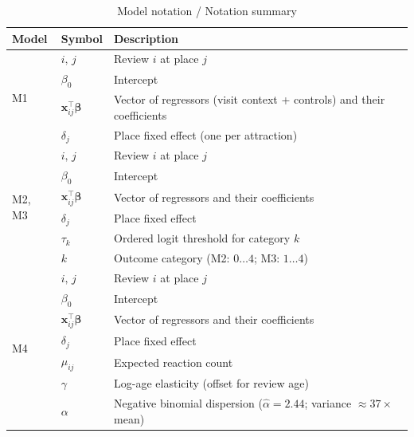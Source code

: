 \documentclass[10pt,a4paper]{article}
\begin{document}
\begin{table}[H]\centering
\caption{Model notation / Notation summary}
\footnotesize
\begin{tabular}{llp{8.2cm}}\toprule
\textbf{Model} & \textbf{Symbol} & \textbf{Description} \\ \midrule
\multirow{4}{*}{M1}
  & $i,\,j$                            & Review $i$ at place $j$ \\
  & $\beta_0$                          & Intercept \\
  & $\mathbf{x}_{ij}^\top\boldsymbol\beta$ & Vector of regressors (visit context + controls) and their coefficients \\
  & $\delta_j$                         & Place fixed effect (one per attraction) \\ \midrule
\multirow{6}{*}{M2, M3}
  & $i,\,j$                            & Review $i$ at place $j$ \\
  & $\beta_0$                          & Intercept \\
  & $\mathbf{x}_{ij}^\top\boldsymbol\beta$ & Vector of regressors and their coefficients \\
  & $\delta_j$                         & Place fixed effect \\
  & $\tau_k$                           & Ordered logit threshold for category $k$ \\
  & $k$                                & Outcome category (M2: $0\!\dots\!4$;\; M3: $1\!\dots\!4$) \\ \midrule
\multirow{7}{*}{M4}
  & $i,\,j$                            & Review $i$ at place $j$ \\
  & $\beta_0$                          & Intercept \\
  & $\mathbf{x}_{ij}^\top\boldsymbol\beta$ & Vector of regressors and their coefficients \\
  & $\delta_j$                         & Place fixed effect \\
  & $\mu_{ij}$                         & Expected reaction count \\
  & $\gamma$                           & Log-age elasticity (offset for review age) \\
  & $\alpha$                           & Negative binomial dispersion ($\hat\alpha = 2.44$; variance $\approx 37\times$ mean) \\ \bottomrule
\end{tabular}
\end{table}

\tblVariableMapEN
\end{document}
